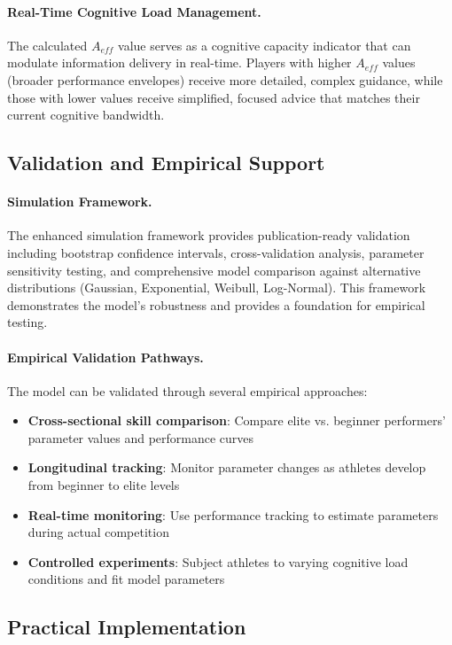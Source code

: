 \documentclass{article}
\begin{document}
\paragraph{Real-Time Cognitive Load Management.} The calculated $A_{eff}$ value serves as a cognitive capacity 
indicator that can modulate information delivery in real-time. Players with higher $A_{eff}$ values (broader 
performance envelopes) receive more detailed, complex guidance, while those with lower values receive simplified, 
focused advice that matches their current cognitive bandwidth.

\subsection*{Validation and Empirical Support}

\paragraph{Simulation Framework.} The enhanced simulation framework provides publication-ready validation including 
bootstrap confidence intervals, cross-validation analysis, parameter sensitivity testing, and comprehensive model 
comparison against alternative distributions (Gaussian, Exponential, Weibull, Log-Normal). This framework 
demonstrates the model's robustness and provides a foundation for empirical testing.

\paragraph{Empirical Validation Pathways.} The model can be validated through several empirical approaches:
\begin{itemize}
    \item \textbf{Cross-sectional skill comparison}: Compare elite vs. beginner performers' parameter values 
    and performance curves
    \item \textbf{Longitudinal tracking}: Monitor parameter changes as athletes develop from beginner to elite levels
    \item \textbf{Real-time monitoring}: Use performance tracking to estimate parameters during actual competition
    \item \textbf{Controlled experiments}: Subject athletes to varying cognitive load conditions and fit model parameters
\end{itemize}

\subsection*{Practical Implementation}
\end{document}
